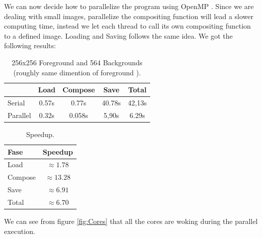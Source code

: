 \documentclass[10pt,twocolumn,letterpaper,english]{article}
\begin{document}
We can now decide how to parallelize the program using OpenMP \cite{openmp}.
Since we are dealing with small images, parallelize the compositing function will lead a slower computing time, instead we let each thread to call its own compositing function to a defined image. Loading and Saving follows the same idea.
We got the following results:
\begin{table}[htbp]
	\centering
	\begin{tabular}{|l|c|c|c|c|}
		\hline
		& Load & Compose & Save & Total\\
		\hline
		Serial & 0.57s & 0.77s & 40.78s & 42,13s\\
		Parallel & 0.32s & 0.058s & 5,90s & 6.29s\\
		\hline
	\end{tabular}
	\caption{256x256 Foreground and 564 Backgrounds (roughly same dimention of foreground ).}
	\label{tab:Mesurements}
\end{table}
\begin{table}[htbp]
	\centering
	\begin{tabular}{|l|c|}
		\hline
		Fase & Speedup \\
		\hline
		Load & $ \approx 1.78$ \\
		Compose & $ \approx 13.28$ \\
		Save & $\approx 6.91$ \\
		Total & $\approx 6.70$ \\
		\hline
	\end{tabular}
	\caption{Speedup.}
	\label{tab:Speedup}
\end{table}
We can see from figure \ref*{fig:Cores} that all the cores are woking during the parallel execution.



{\small


}
\end{document}
